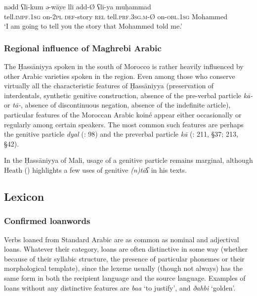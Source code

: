 \documentclass[output=paper]{langsci/langscibook}
\begin{document}
\ea
\gll n{\R}ədd ʕlī-kum ə{\R}-{\R}wāye lli {\R}add-Ø ʕlī-ya muḥammad\\
 tell.\textsc{impf.}1\textsc{sg} on-2\textsc{pl} \textsc{def-}story \textsc{rel} tell.\textsc{prf.3sg.m-}Ø on-\textsc{obl.1sg} Mohammed\\
\glt ‘I am going to tell you the story that Mohammed told me.’ 
\z

\subsubsection{Regional influence of Maghrebi Arabic} %

The Ḥassāniyya spoken in the south of Morocco is rather heavily influenced by other Arabic varieties spoken in the region. Even among those who conserve virtually all the characteristic features of Ḥassāniyya (preservation of interdentals, synthetic genitive construction, absence of the pre-verbal particle \textit{kā-} or \textit{tā-}, absence of discontinuous negation, absence of the indefinite article), particular features of the Moroccan Arabic koiné appear either occasionally or regularly among certain speakers. The most common such features are perhaps the genitive particle \textit{dyal} (\citealt{Taine-Cheikh1997socio}: 98) and the preverbal particle \textit{kā} (\citealt{Aguadé1998}: 211, §37; 213, §42).

In the Ḥassāniyya of Mali, usage of a genitive particle remains marginal, although Heath (\citeyear[162]{Heath2004}) highlights a few uses of genitive \textit{(n)tāʕ} in his texts.

\subsection{Lexicon} %

\subsubsection{Confirmed loanwords} %


Verbs loaned from Standard Arabic are as common as nominal and adjectival loans. Whatever their category, loans are often distinctive in some way (whether because of their syllabic structure, the presence of particular phonemes or their morphological template), since the lexeme usually (though not always) has the same form in both the recipient language and the source language. Examples of loans without any distinctive features are \textit{ba{\R}{\R}a{\R}} ‘to justify’, and \textit{ðahbi} ‘golden’. 
\end{document}
